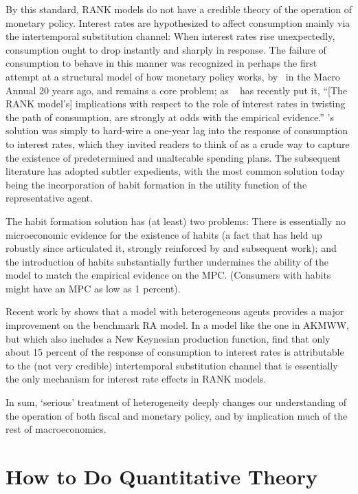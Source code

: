 \documentclass[titlepage]{econtex}
\begin{document}
By this standard, RANK models do not have a credible theory of the operation of monetary policy.  Interest rates are hypothesized to affect consumption mainly via the intertemporal substitution channel: When interest rates rise unexpectedly, consumption ought to drop instantly and sharply in response.  The failure of consumption to behave in this manner was recognized in perhaps the first attempt at a structural model of how monetary policy works, by~\cite{rotemberg&woodford:macroannual} in the Macro Annual 20 years ago, and remains a core problem; as ~\cite{blanchardDSGE} has recently put it, ``[The RANK model's] implications with respect to the role of interest rates in twisting the path of consumption, are strongly at odds with the empirical evidence.'' \cite{rotemberg&woodford:macroannual}'s solution was simply to hard-wire a one-year lag into the response of consumption to interest rates, which they invited readers to think of as a crude way to capture the existence of predetermined and unalterable spending plans.  The subsequent literature has adopted subtler expedients, with the most common solution today being the incorporation of habit formation in the utility function of the representative agent.

The habit formation solution has (at least) two problems: There is essentially no microeconomic evidence for the existence of habits (a fact that has held up robustly since \cite{deatonUnderstandingCNotes} articulated it, strongly reinforced by \cite{dynanHabits} and subsequent work); and the introduction of habits substantially further undermines the ability of the model to match the empirical evidence on the MPC.  (Consumers with habits might have an MPC as low as 1 percent).  

Recent work by \cite{kmvHANK} shows that a model with heterogeneous agents provides a major improvement on the benchmark RA model. In a model like the one in AKMWW, but which also includes a New Keynesian production function,  \cite{kmvHANK} find that only about 15 percent of the response of consumption to interest rates is attributable to the (not very credible) intertemporal substitution channel that is essentially the only mechanism for interest rate effects in RANK models.

In sum, `serious' treatment of heterogeneity deeply changes our understanding of the operation of both fiscal and monetary policy, and by implication much of the rest of macroeconomics.  

\section{How to Do Quantitative Theory}
\end{document}
